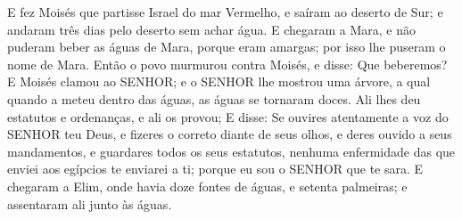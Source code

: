 {E fez Moisés que partisse Israel do mar Vermelho, e saíram ao deserto de Sur; e andaram três dias pelo deserto sem achar água.
E chegaram a Mara, e não puderam beber as águas de Mara, porque eram amargas; por isso lhe puseram o nome de Mara.
Então o povo murmurou contra Moisés, e disse: Que beberemos?
E Moisés clamou ao SENHOR; e o SENHOR lhe mostrou uma árvore, a qual quando a meteu dentro das águas, as águas se tornaram doces. Ali lhes deu estatutos e ordenanças, e ali os provou;
E disse: Se ouvires atentamente a voz do SENHOR teu Deus, e fizeres o correto diante de seus olhos, e deres ouvido a seus mandamentos, e guardares todos os seus estatutos, nenhuma enfermidade das que enviei aos egípcios te enviarei a ti; porque eu sou o SENHOR que te sara.
E chegaram a Elim, onde havia doze fontes de águas, e setenta palmeiras; e assentaram ali junto às águas.

}
